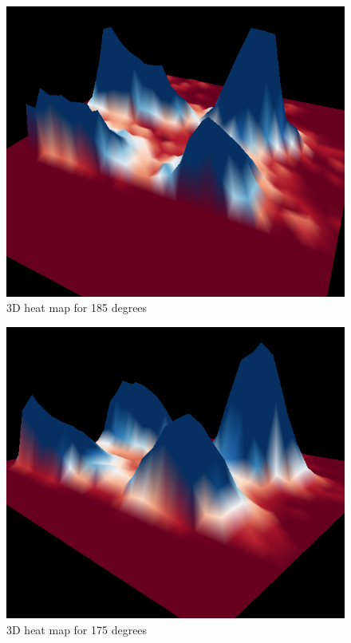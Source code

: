 \documentclass[a4paper, amsfonts, amssymb, amsmath, reprint, showkeys, nofootinbib, twoside]{revtex4-1}
\begin{document}
\begin{figure}[H]
	\centering
	\includegraphics[scale=0.4]{185} 
	\caption{3D heat map for 185 degrees }
	\label{s}
\end{figure}

\begin{figure}[H]
	\centering
	\includegraphics[scale=0.38]{175} 
	\caption{3D heat map for 175 degrees }
	\label{s}
\end{figure}
\end{document}
